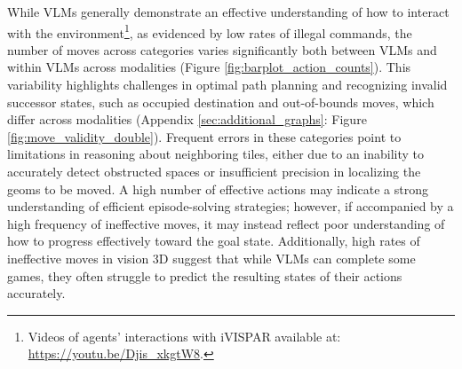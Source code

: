 While VLMs generally demonstrate an effective understanding of how to interact with the environment\footnote{Videos of agents' interactions with iVISPAR available at: 
\href{https://youtu.be/Djis_xkgtW8}{https://youtu.be/Djis\_xkgtW8}.}, as evidenced by low rates of illegal commands, the number of moves across categories varies significantly both between VLMs and within VLMs across modalities (Figure \ref{fig:barplot_action_counts}). This variability highlights challenges in optimal path planning and recognizing invalid successor states, such as occupied destination and out-of-bounds moves, which differ across modalities (Appendix \ref{sec:additional_graphs}: Figure \ref{fig:move_validity_double}). Frequent errors in these categories point to limitations in reasoning about neighboring tiles, either due to an inability to accurately detect obstructed spaces or insufficient precision in localizing the geoms to be moved. A high number of effective actions may indicate a strong understanding of efficient episode-solving strategies; however, if accompanied by a high frequency of ineffective moves, it may instead reflect poor understanding of how to progress effectively toward the goal state. Additionally, high rates of ineffective moves in vision 3D suggest that while VLMs can complete some games, they often struggle to predict the resulting states of their actions accurately.